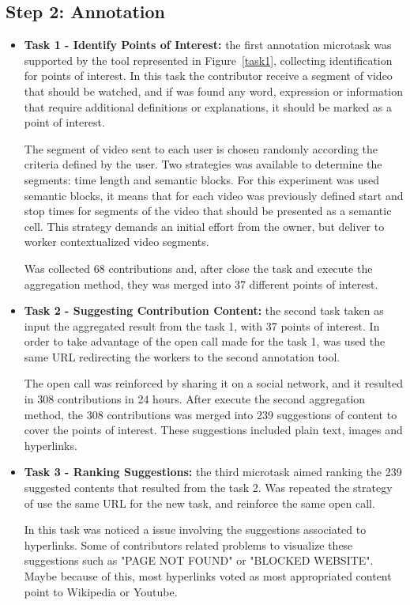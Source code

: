 \subsection{Step 2: Annotation}
	\begin{itemize}
		\item \textbf{Task 1 - Identify Points of Interest:} the first annotation microtask was supported by the tool represented in Figure~\ref{task1}, collecting identification for points of interest. In this task the contributor receive a segment of video that should be watched, and if was found any word, expression or information that require additional definitions or explanations, it should be marked as a point of interest.
		
		The segment of video sent to each user is chosen randomly according the criteria defined by the user. Two strategies was available to determine the segments: time length and semantic blocks. For this experiment was used semantic blocks, it means that for each video was previously defined start and stop times for segments of the video that should be presented as a semantic cell. This strategy demands an initial effort from the owner, but deliver to worker contextualized video segments. 
		
		Was collected 68 contributions and, after close the task and execute the aggregation method, they was merged into 37 different points of interest.

	
		\item \textbf{Task 2 - Suggesting Contribution Content:} the second task taken as input the aggregated result from the task 1, with 37 points of interest. In order to take advantage of the open call made for the task 1, was used the same URL redirecting the workers to the second annotation tool.
		
		The open call was reinforced by sharing  it on a social network, and it resulted in 308 contributions in 24 hours. After execute the second aggregation method, the 308 contributions was merged into 239 suggestions of content to cover the points of interest. These suggestions included plain text, images and hyperlinks.
		
	
	
		\item \textbf{Task 3 - Ranking Suggestions:} the third microtask aimed ranking the 239 suggested contents that resulted from the task 2. Was repeated the strategy of use the same URL for the new task, and reinforce the same open call.
		
		In this task was noticed a issue involving the suggestions associated to hyperlinks. Some of contributors related problems to visualize these suggestions such as "PAGE NOT FOUND" or "BLOCKED WEBSITE". Maybe because of this, most hyperlinks voted as most appropriated content point to Wikipedia or Youtube.
		

\end{itemize}
